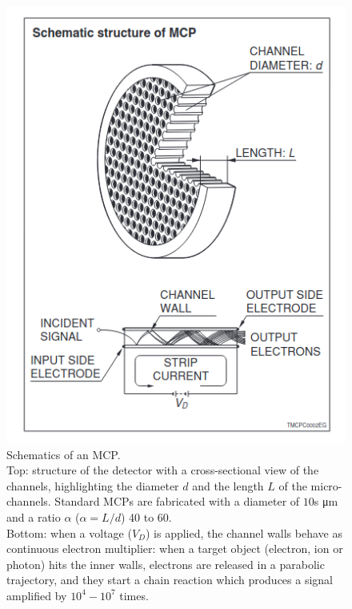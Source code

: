 \begin{figure}
\begin{minipage}[c]{.45\linewidth}
    \includegraphics[width=1\linewidth]{Images/TestBeam_setup/MCP diagram HAMAMATSU.png}
\end{minipage}
\hfill
\begin{minipage}[c]{.5\linewidth}
    \caption{
    Schematics of an MCP.\\ 
    Top: structure of the detector with a cross-sectional view of the channels, highlighting the diameter \(d\) and the length \(L\) of the micro-channels. Standard MCPs are fabricated with a diameter of \(10\)s \unit{\micro\meter} and a ratio \(\alpha\) (\(\alpha = L / d\)) 40 to 60.\\
    Bottom: when a voltage (\(V_D\)) is applied, the channel walls behave as continuous electron multiplier: when a target object (electron, ion or photon) hits the inner walls, electrons are released in a parabolic trajectory, and they start a chain reaction which produces a signal amplified by \(10^4-10^7\) times.}
\end{minipage}
\label{fig:MCP_diagrame}
\end{figure}


